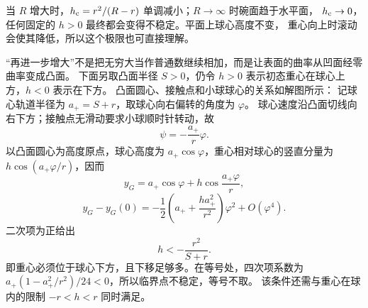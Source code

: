 {\begin{xesolution}
当 $R$ 增大时，$h_{\rm c}=r^2/(R-r)$ 单调减小；$R\to\infty$ 时碗面趋于水平面，
$h_{\rm c}\to0$，任何固定的 $h>0$ 最终都会变得不稳定。平面上球心高度不变，
重心向上时滚动会使其降低，所以这个极限也可直接理解。

“再进一步增大”不是把无穷大当作普通数继续相加，而是让表面的曲率从凹面经零曲率变成凸面。
下面另取凸面半径 $S>0$，仍令 $h>0$ 表示初态重心在球心上方，$h<0$ 表示在下方。
\Needspace{65mm}
凸面圆心、接触点和小球球心的关系如解图所示：
\soldiagConvexRolling
记球心轨道半径为 $a_+=S+r$，取球心向右偏转的角度为 $\varphi$。
球心速度沿凸面切线向右下方；接触点无滑动要求小球顺时针转动，故
\[
 \psi=-\frac{a_+}{r}\varphi.
\]
以凸面圆心为高度原点，球心高度为 $a_+\cos\varphi$，重心相对球心的竖直分量为
$h\cos(a_+\varphi/r)$，因而
\[
 y_G=a_+\cos\varphi+h\cos\frac{a_+\varphi}{r},
\]
\[
 y_G-y_G(0)=-\frac12\left(a_++\frac{ha_+^2}{r^2}\right)\varphi^2+O(\varphi^4).
\]
二次项为正给出
\[
 \boxed{h<-\frac{r^2}{S+r}}.
\]
即重心必须位于球心下方，且下移足够多。在等号处，四次项系数为
$a_+(1-a_+^2/r^2)/24<0$，所以临界点不稳定，等号不取。
该条件还需与重心在球内的限制 $-r<h<r$ 同时满足。
\end{xesolution}
}

\endgroup
